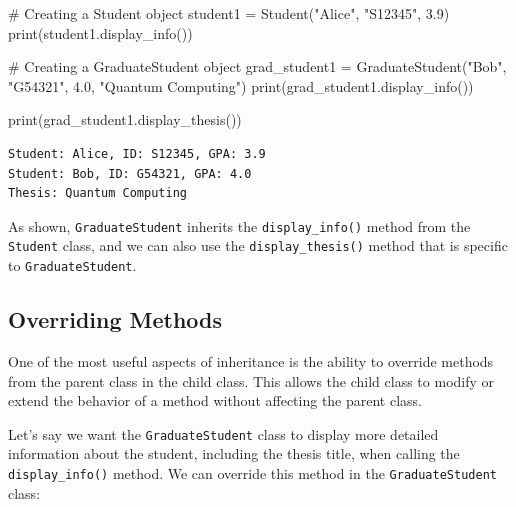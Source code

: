 \documentclass[
  letterpaper,
  DIV=11,
  numbers=noendperiod]{scrreprt}
\newenvironment{Shaded}{\begin{snugshade}}{\end{snugshade}}
\newcommand{\BuiltInTok}[1]{\textcolor[rgb]{0.00,0.23,0.31}{#1}}
\newcommand{\CommentTok}[1]{\textcolor[rgb]{0.37,0.37,0.37}{#1}}
\newcommand{\FloatTok}[1]{\textcolor[rgb]{0.68,0.00,0.00}{#1}}
\newcommand{\NormalTok}[1]{\textcolor[rgb]{0.00,0.23,0.31}{#1}}
\newcommand{\OperatorTok}[1]{\textcolor[rgb]{0.37,0.37,0.37}{#1}}
\newcommand{\StringTok}[1]{\textcolor[rgb]{0.13,0.47,0.30}{#1}}
\begin{document}
\begin{Shaded}
\begin{Highlighting}[]
\CommentTok{\# Creating a Student object}
\NormalTok{student1 }\OperatorTok{=}\NormalTok{ Student(}\StringTok{"Alice"}\NormalTok{, }\StringTok{"S12345"}\NormalTok{, }\FloatTok{3.9}\NormalTok{)}
\BuiltInTok{print}\NormalTok{(student1.display\_info())  }

\CommentTok{\# Creating a GraduateStudent object}
\NormalTok{grad\_student1 }\OperatorTok{=}\NormalTok{ GraduateStudent(}\StringTok{"Bob"}\NormalTok{, }\StringTok{"G54321"}\NormalTok{, }\FloatTok{4.0}\NormalTok{, }\StringTok{"Quantum Computing"}\NormalTok{)}
\BuiltInTok{print}\NormalTok{(grad\_student1.display\_info())  }

\BuiltInTok{print}\NormalTok{(grad\_student1.display\_thesis())  }
\end{Highlighting}
\end{Shaded}

\begin{verbatim}
Student: Alice, ID: S12345, GPA: 3.9
Student: Bob, ID: G54321, GPA: 4.0
Thesis: Quantum Computing
\end{verbatim}

As shown, \texttt{GraduateStudent} inherits the \texttt{display\_info()}
method from the \texttt{Student} class, and we can also use the
\texttt{display\_thesis()} method that is specific to
\texttt{GraduateStudent}.

\hypertarget{overriding-methods}{%
\subsection{Overriding Methods}\label{overriding-methods}}

One of the most useful aspects of inheritance is the ability to override
methods from the parent class in the child class. This allows the child
class to modify or extend the behavior of a method without affecting the
parent class.

Let's say we want the \texttt{GraduateStudent} class to display more
detailed information about the student, including the thesis title, when
calling the \texttt{display\_info()} method. We can override this method
in the \texttt{GraduateStudent} class:
\end{document}
